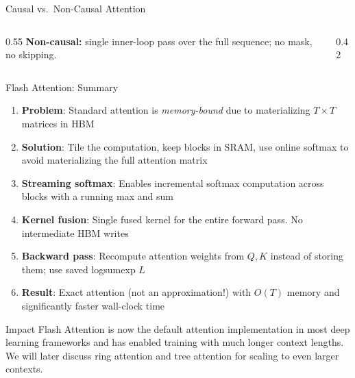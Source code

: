 \begin{frame}{Causal vs.\ Non-Causal Attention}
\begin{columns}
\begin{column}{0.55\textwidth}
      \vspace{0.3em}
      \textbf{Non-causal:} single inner-loop pass over the full sequence; no mask, no skipping.
    \end{column}
    \begin{column}{0.42\textwidth}
      \begin{center}
      \end{center}
    \end{column}
  \end{columns}
\end{frame}

\begin{frame}{Flash Attention: Summary}

  \begin{enumerate}
    \item \textbf{Problem}: Standard attention is \emph{memory-bound} due to materializing $T \times T$ matrices in HBM
    \item \textbf{Solution}: Tile the computation, keep blocks in SRAM, use online softmax to avoid materializing the full attention matrix
    \item \textbf{Streaming softmax}: Enables incremental softmax computation across blocks with a running max and sum
    \item \textbf{Kernel fusion}: Single fused kernel for the entire forward pass. No intermediate HBM writes
    \item \textbf{Backward pass}: Recompute attention weights from $Q, K$ instead of storing them; use saved logsumexp $L$
    \item \textbf{Result}: Exact attention (not an approximation!) with $O(T)$ memory and significantly faster wall-clock time
  \end{enumerate}

  \vspace{0.5em}
  \begin{alertblock}{Impact}
    Flash Attention is now the default attention implementation in most deep learning frameworks and has enabled training with much longer context lengths.
    We will later discuss ring attention and tree attention for scaling to even larger contexts.
  \end{alertblock}
\end{frame}
